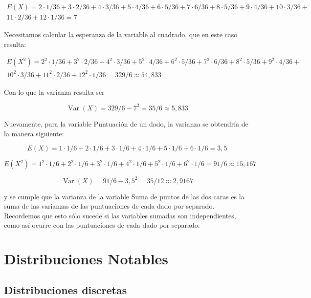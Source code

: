 \documentclass[
  a4paper,
  DIV=11,
  numbers=noendperiod]{scrreprt}
\begin{document}
\[
\begin{gathered}
E(X)=2 \cdot 1 / 36+3 \cdot 2 / 36+4 \cdot 3 / 36+5 \cdot 4 / 36+6 \cdot 5 / 36+7 \cdot 6 / 36+8 \cdot 5 / 36+9 \cdot 4 / 36+10 \cdot 3 / 36+ \\
11 \cdot 2 / 36+12 \cdot 1 / 36=7
\end{gathered}
\]

Necesitamos calcular la esperanza de la variable al cuadrado, que en
este caso resulta:

\[
\begin{gathered}
E\left(X^{2}\right)=2^{2} \cdot 1 / 36+3^{2} \cdot 2 / 36+4^{2} \cdot 3 / 36+5^{2} \cdot 4 / 36+6^{2} \cdot 5 / 36+7^{2} \cdot 6 / 36+8^{2} \cdot 5 / 36+9^{2} \cdot 4 / 36+ \\
10^{2} \cdot 3 / 36+11^{2} \cdot 2 / 36+12^{2} \cdot 1 / 36=329 / 6 \approx 54,833
\end{gathered}
\]

Con lo que la varianza resulta ser

\[
\operatorname{Var}(X)=329 / 6-7^{2}=35 / 6 \approx 5,833
\]

Nuevamente, para la variable Puntuación de un dado, la varianza se
obtendría de la manera siguiente:

\[
E(X)=1 \cdot 1 / 6+2 \cdot 1 / 6+3 \cdot 1 / 6+4 \cdot 1 / 6+5 \cdot 1 / 6+6 \cdot 1 / 6=3,5
\]

\[
E\left(X^{2}\right)=1^{2} \cdot 1 / 6+2^{2} \cdot 1 / 6+3^{2} \cdot 1 / 6+4^{2} \cdot 1 / 6+5^{2} \cdot 1 / 6+6^{2} \cdot 1 / 6=91 / 6 \approx 15,167
\]

\[
\operatorname{Var}(X)=91 / 6-3,5^{2}=35 / 12 \approx 2,9167
\]

y se cumple que la varianza de la variable Suma de puntos de las dos
caras es la suma de las varianzas de las puntuaciones de cada dado por
separado. Recordemos que esto sólo sucede si las variables sumadas son
independientes, como así ocurre con las puntuaciones de cada dado por
separado.


\chapter{Distribuciones Notables}\label{distribuciones-notables}

\section{Distribuciones discretas}\label{distribuciones-discretas}
\end{document}
